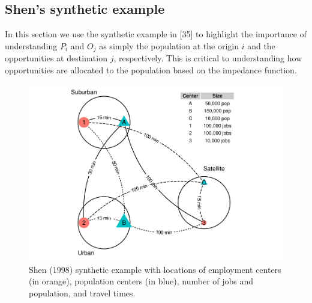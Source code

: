 \documentclass[10pt,letterpaper]{article}
\begin{document}
\hypertarget{shens-synthetic-example}{%
\subsection{Shen's synthetic example}\label{shens-synthetic-example}}

In this section we use the synthetic example in {[}35{]} to highlight
the importance of understanding \(P_i\) and \(O_j\) as simply the
population at the origin \(i\) and the opportunities at destination
\(j\), respectively. This is critical to understanding how opportunities
are allocated to the population based on the impedance function.

\begin{figure}

{\centering \includegraphics[width=1\linewidth]{Spatial-Availability-Paper_files/figure-latex/create-figure-with-toy-example-1} 

}

\caption{\label{fig:plot-toy-example} Shen (1998) synthetic example with locations of employment centers (in orange), population centers (in blue), number of jobs and population, and travel times.}\label{fig:create-figure-with-toy-example}
\end{figure}

 
  \providecommand{\huxb}[2]{\arrayrulecolor[RGB]{#1}\global\arrayrulewidth=#2pt}
  \providecommand{\huxvb}[2]{\color[RGB]{#1}\vrule width #2pt}
  \providecommand{\huxtpad}[1]{\rule{0pt}{#1}}
  \providecommand{\huxbpad}[1]{\rule[-#1]{0pt}{#1}}
\end{document}
